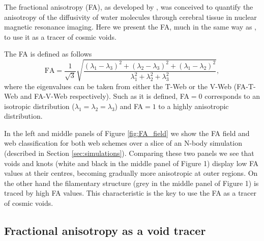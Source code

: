 \documentclass[a4,useAMS,usenatbib,usegraphicx]{mn2e}
\newcommand{\eq}[2]{\begin{equation} \label{eq:#1} #2 \end{equation}}
\begin{document}
The fractional anisotropy (FA), as developed by \citet{Basser95}, was 
conceived to quantify the anisotropy of the diffusivity of water
molecules through cerebral tissue in nuclear magnetic resonance imaging. 
Here we present the FA, much in the same way as \citet{Libeskind13},
to use it as a tracer of cosmic voids.


The FA is defined as follows
\eq{fractional_anisotropy}
{{\mathrm{FA}} = \frac{1}{\sqrt{3}}\sqrt{ \frac{ (\lambda_1 - \lambda_3)^2 + 
(\lambda_2 - \lambda_3)^2 + (\lambda_1 - \lambda_2)^2}{ \lambda_1^2 + 
\lambda_2^2 + \lambda_3^2} },}
where the eigenvalues can be taken from either the T-Web or the V-Web 
(FA-T-Web and FA-V-Web respectively). Such as it is defined, FA$=0$ 
corresponds to an isotropic distribution ($\lambda_1=\lambda_2=\lambda_3$) 
and FA$=1$ to a highly anisotropic distribution.


In the left and middle panels of Figure \ref{fig:FA_field} we show the
FA field and web classification for both  web schemes over a slice of
an N-body simulation (described in Section \ref{sec:simulations}). 
Comparing these two panels we see that voids and knots (white
and black in the middle panel of Figure 1) display low FA values at
their  centres, becoming gradually more anisotropic at outer regions.  
On the other hand the filamentary structure (grey in the middle panel
of Figure 1) is traced by high FA values.  
This characteristic is the  key to use the FA as a tracer of cosmic
voids.  


\subsection{Fractional anisotropy as a void tracer}
\label{subsec:web_voids}
\end{document}
